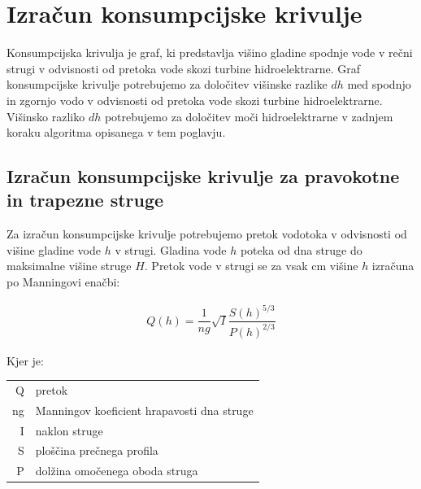 \section{Izračun konsumpcijske krivulje}
Konsumpcijska krivulja je graf, ki predstavlja višino gladine spodnje vode v rečni strugi v odvisnosti od pretoka vode skozi turbine hidroelektrarne. Graf konsumpcijske krivulje potrebujemo za določitev višinske razlike $dh$ med spodnjo in zgornjo vodo v odvisnosti od pretoka vode skozi turbine hidroelektrarne. Višinsko razliko $dh$ potrebujemo za določitev moči hidroelektrarne v zadnjem koraku algoritma opisanega v tem poglavju.



\subsection{Izračun konsumpcijske krivulje za pravokotne in trapezne struge} \label{sec:pretok_prav_trapez}
Za izračun konsumpcijske krivulje potrebujemo pretok vodotoka v odvisnosti od višine gladine vode $h$ v strugi. Gladina vode $h$ poteka od dna struge do maksimalne višine struge $H$. Pretok vode v strugi se za vsak cm višine $h$ izračuna po Manningovi enačbi:

\begin{ceqn}
\begin{align}
Q(h) = \dfrac{1}{ng} \sqrt{I}\dfrac{S(h)^{5/3}}{P(h)^{2/3}} \label{eq:ManningovaEnacba}
\end{align}
\end{ceqn}

Kjer je:

\begin{table}[htb!]
	\begin{tabular}{r|p{10cm}}
		Q & pretok \\
		ng & Manningov koeficient hrapavosti dna struge\\
		I & naklon struge \\
		S & ploščina prečnega profila \\
		P & dolžina omočenega oboda struga
	\end{tabular}
\end{table}



